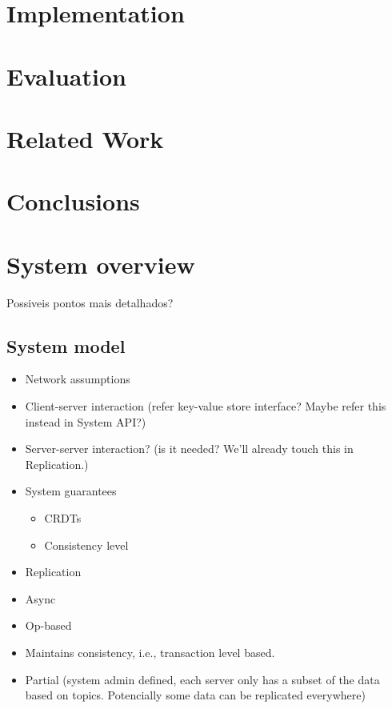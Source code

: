 \documentclass{vldb}
\begin{document}
\section{Implementation}

\section{Evaluation}

\section{Related Work}

\section{Conclusions}

\section{System overview}

\vspace{8cm}
Possiveis pontos mais detalhados?

\subsection{System model}

\begin{itemize}
	\item Network assumptions
	\item Client-server interaction (refer key-value store interface? Maybe refer this instead in System API?)
	\item Server-server interaction? (is it needed? We'll already touch this in Replication.)
	\item System guarantees
	\begin{itemize}
		\item CRDTs
		\item Consistency level	
	\end{itemize}
	\item Replication
		\item Async
		\item Op-based
		\item Maintains consistency, i.e., transaction level based.
		\item Partial (system admin defined, each server only has a subset of the data based on topics. Potencially some data can be replicated everywhere)
\end{itemize}
\end{document}
